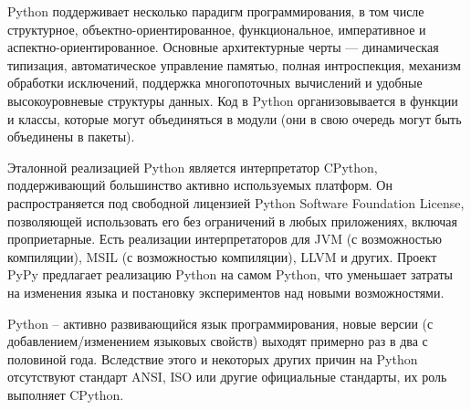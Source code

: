 Python поддерживает несколько парадигм программирования, в том числе структурное, объектно-ориентированное, функциональное, императивное и аспектно-ориентированное. Основные архитектурные черты — динамическая типизация, автоматическое управление памятью, полная интроспекция, механизм обработки исключений, поддержка многопоточных вычислений и удобные высокоуровневые структуры данных. Код в Python организовывается в функции и классы, которые могут объединяться в модули (они в свою очередь могут быть объединены в пакеты).

Эталонной реализацией Python является интерпретатор CPython, поддерживающий большинство активно используемых платформ. Он распространяется под свободной лицензией Python Software Foundation License, позволяющей использовать его без ограничений в любых приложениях, включая проприетарные. Есть реализации интерпретаторов для JVM (с возможностью компиляции), MSIL (с возможностью компиляции), LLVM и других. Проект PyPy предлагает реализацию Python на самом Python, что уменьшает затраты на изменения языка и постановку экспериментов над новыми возможностями.

Python -- активно развивающийся язык программирования, новые версии (с добавлением/изменением языковых свойств) выходят примерно раз в два с половиной года. Вследствие этого и некоторых других причин на Python отсутствуют стандарт ANSI, ISO или другие официальные стандарты, их роль выполняет CPython.

